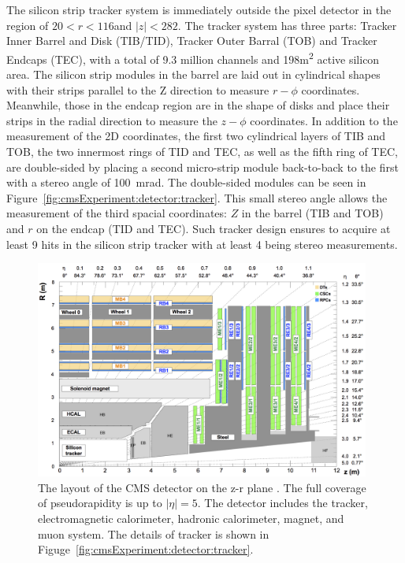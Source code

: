 The silicon strip tracker system is immediately outside the pixel detector in the region of $20<r<116$\cm and $|z|<282$\cm. The tracker system has three parts: Tracker Inner Barrel and Disk (TIB/TID), Tracker Outer Barral (TOB) and Tracker Endcaps (TEC), with a total of 9.3 million channels and 198\si{\m \squared} active silicon area. The silicon strip modules in the barrel are laid out in cylindrical shapes with their strips parallel to the Z direction to measure $r-\phi$ coordinates. Meanwhile, those in the endcap region are in the shape of disks and place their strips in the radial direction to measure the $z-\phi$ coordinates. In addition to the measurement of the 2D coordinates, the first two cylindrical layers of TIB and TOB, the two innermost rings of TID and TEC, as well as the fifth ring of TEC, are double-sided by placing a second micro-strip module back-to-back to the first with a stereo angle of 100~mrad. The double-sided modules can be seen in Figure~\ref{fig:cmsExperiment:detector:tracker}. This small stereo angle allows the measurement of the third spacial coordinates: $Z$ in the barrel (TIB and TOB) and $r$ on the endcap (TID and TEC). Such tracker design ensures to acquire at least 9 hits in the silicon strip tracker with at least 4 being stereo measurements. 




\begin{figure}[ht]
    \centering
    \includegraphics[width=0.98\textwidth]{chapters/CMSExperiment/sectionDetector/figures/detectorLayout.png}
    \caption{The layout of the CMS detector on the z-r plane \cite{cms:muonChamberWebsite}. The full coverage of pseudorapidity is up to $|\eta|=5$. The detector includes the tracker, electromagnetic calorimeter, hadronic calorimeter, magnet, and muon system. The details of tracker is shown in Figuge~\ref{fig:cmsExperiment:detector:tracker}. }
    \label{fig:cmsExperiment:detector:detectorLayout}
\end{figure}





